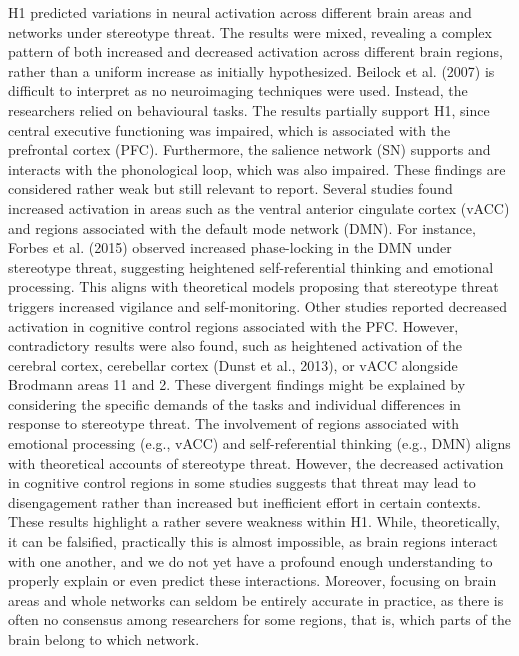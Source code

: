 \documentclass[
  stu, a4paper, 12pt,mask,floatsintext]{apa7}
\begin{document}
H1 predicted variations in neural activation across different brain areas and networks under stereotype threat.
The results were mixed, revealing a complex pattern of both increased and decreased activation across different brain regions, rather than a uniform increase as initially hypothesized.
Beilock et al. (2007) is difficult to interpret as no neuroimaging techniques were used.
Instead, the researchers relied on behavioural tasks.
The results partially support H1, since central executive functioning was impaired, which is associated with the prefrontal cortex (PFC).
Furthermore, the salience network (SN) supports and interacts with the phonological loop, which was also impaired. These findings are considered rather weak but still relevant to report.
Several studies found increased activation in areas such as the ventral anterior cingulate cortex (vACC) and regions associated with the default mode network (DMN).
For instance, Forbes et al. (2015) observed increased phase-locking in the DMN under stereotype threat, suggesting heightened self-referential thinking and emotional processing.
This aligns with theoretical models proposing that stereotype threat triggers increased vigilance and self-monitoring.
Other studies reported decreased activation in cognitive control regions associated with the PFC.
However, contradictory results were also found, such as heightened activation of the cerebral cortex, cerebellar cortex (Dunst et al., 2013), or vACC alongside Brodmann areas 11 and 2.
These divergent findings might be explained by considering the specific demands of the tasks and individual differences in response to stereotype threat.
The involvement of regions associated with emotional processing (e.g., vACC) and self-referential thinking (e.g., DMN) aligns with theoretical accounts of stereotype threat.
However, the decreased activation in cognitive control regions in some studies suggests that threat may lead to disengagement rather than increased but inefficient effort in certain contexts.\\
These results highlight a rather severe weakness within H1.
While, theoretically, it can be falsified, practically this is almost impossible, as brain regions interact with one another, and we do not yet have a profound enough understanding to properly explain or even predict these interactions.
Moreover, focusing on brain areas and whole networks can seldom be entirely accurate in practice, as there is often no consensus among researchers for some regions, that is, which parts of the brain belong to which network.
\end{document}
